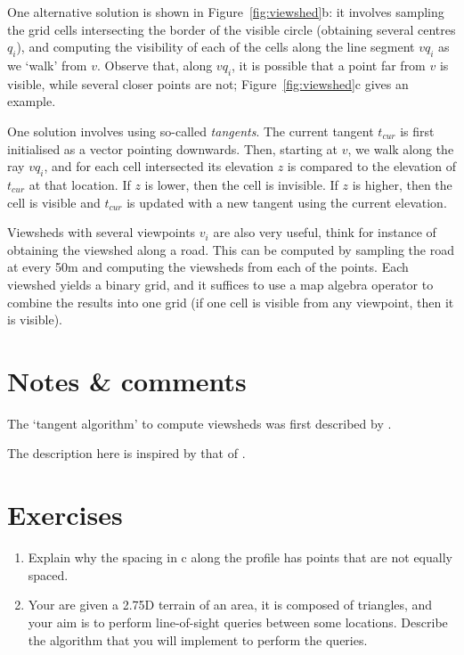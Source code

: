 %

One alternative solution is shown in Figure~\ref{fig:viewshed}b: it involves sampling the grid cells intersecting the border of the visible circle (obtaining several centres $q_i$), and computing the visibility of each of the cells along the line segment $vq_i$ as we `walk' from $v$.
Observe that, along $vq_i$, it is possible that a point far from $v$ is visible, while several closer points are not; Figure~\ref{fig:viewshed}c gives an example.

One solution involves using so-called \emph{tangents}.
The current tangent $t_{cur}$ is first initialised as a vector pointing downwards.
Then, starting at $v$, we walk along the ray $vq_i$, and for each cell intersected its elevation $z$ is compared to the elevation of $t_{cur}$ at that location.
If $z$ is lower, then the cell is invisible.
If $z$ is higher, then the cell is visible and $t_{cur}$ is updated with a new tangent using the current elevation.

Viewsheds with several viewpoints $v_i$ are also very useful, think for instance of obtaining the viewshed along a road.
This can be computed by sampling the road at every 50m and computing the viewsheds from each of the points. 
Each viewshed yields a binary grid, and it suffices to use a map algebra operator to combine the results into one grid (if one cell is visible from any viewpoint, then it is visible).


%
\section{Notes \& comments}

The `tangent algorithm' to compute viewsheds was first described by \citet{Blelloch90}.

The description here is inspired by that of \citet{DeFloriani99-1}.


%
\section{Exercises}

\begin{enumerate}
  \item Explain why the spacing in c along the profile has points that are not equally spaced.
  \item Your are given a 2.75D terrain of an area, it is composed of triangles, and your aim is to perform line-of-sight queries between some locations. Describe the algorithm that you will implement to perform the queries.
\end{enumerate}
